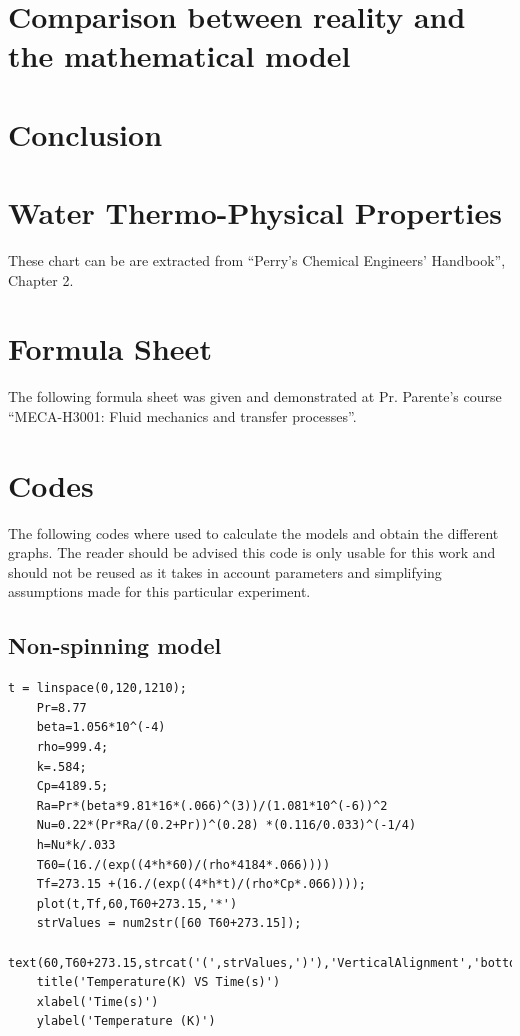 \documentclass{report}
\begin{document}
	\chapter[Reality and mathematical model]{Comparison between reality and the mathematical model}\label{rvmm}
	
	\chapter{Conclusion}\label{ccl}
	
	
	\appendix
	
	\chapter{Water Thermo-Physical Properties}\label{WTPP}
	
	These chart can be are extracted from ``Perry’s	Chemical Engineers’ Handbook'', Chapter 2\cite{properties}.
	
	
	
	\chapter{Formula Sheet}\label{FORMU}
	
	The following formula sheet was given and demonstrated at Pr. Parente's course ``MECA-H3001: Fluid mechanics and transfer processes''.
	
	
	
	\chapter{Codes}
	
	The following codes where used to calculate the models and obtain the different graphs. The reader should be advised this code is only usable for this work and should not be reused as it takes in account parameters and simplifying assumptions made for this particular experiment.
	
	\section{Non-spinning model}\label{codeNS}
	
	\begin{lstlisting}[style=Matlab-editor]
	t = linspace(0,120,1210);
	Pr=8.77
	beta=1.056*10^(-4)
	rho=999.4;
	k=.584;
	Cp=4189.5;
	Ra=Pr*(beta*9.81*16*(.066)^(3))/(1.081*10^(-6))^2
	Nu=0.22*(Pr*Ra/(0.2+Pr))^(0.28) *(0.116/0.033)^(-1/4)
	h=Nu*k/.033
	T60=(16./(exp((4*h*60)/(rho*4184*.066))))
	Tf=273.15 +(16./(exp((4*h*t)/(rho*Cp*.066))));
	plot(t,Tf,60,T60+273.15,'*')
	strValues = num2str([60 T60+273.15]);
	text(60,T60+273.15,strcat('(',strValues,')'),'VerticalAlignment','bottom');
	title('Temperature(K) VS Time(s)')
	xlabel('Time(s)')
	ylabel('Temperature (K)')
	\end{lstlisting}
	
\end{document}
